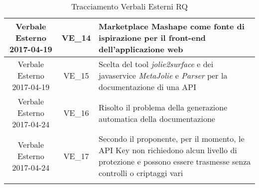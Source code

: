 \begin{longtable}[H]{|c|c|p{7cm}|}
			\hline
			Verbale Esterno 2017-04-19 & VE\_14	&  Marketplace Mashape come fonte di ispirazione per il front-end dell'applicazione web \\
			\hline
			Verbale Esterno 2017-04-19 & VE\_15 &  Scelta del tool \textit{jolie2surface} e dei javaservice \textit{MetaJolie} e \textit{Parser} per la documentazione di una API\\
			\hline
			Verbale Esterno 2017-04-24 & VE\_16	&  Risolto il problema della generazione automatica della documentazione \\
			\hline
			Verbale Esterno 2017-04-24 & VE\_17 & Secondo il proponente, per il momento, le API Key non richiedono alcun livello di protezione e possono essere trasmesse senza controlli o criptaggi vari \\
			\hline
			\caption{Tracciamento Verbali Esterni RQ}
\end{longtable}